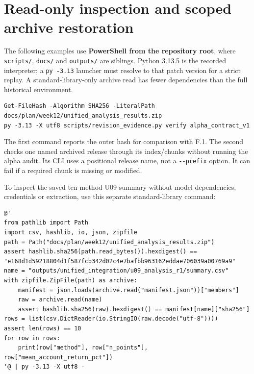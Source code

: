 \section{Read-only inspection and scoped archive restoration}\label{s:5f1ea8a5eac1b7a0}

The following examples use \textbf{PowerShell from the repository root}, where
\texttt{scripts/\allowbreak{}}, \texttt{docs/\allowbreak{}} and \texttt{outputs/\allowbreak{}} are siblings. Python 3.13.5 is the
recorded interpreter; a \texttt{py -\allowbreak{}3.\allowbreak{}13} launcher must resolve to that patch
version for a strict replay. A standard-library-only archive read has
fewer dependencies than the full historical environment.

\begin{Verbatim}[fontsize=\small,breaklines=true,breakanywhere=true]
Get-FileHash -Algorithm SHA256 -LiteralPath docs/plan/week12/unified_analysis_results.zip
py -3.13 -X utf8 scripts/revision_evidence.py verify alpha_contract_v1
\end{Verbatim}

The first command reports the outer hash for comparison with F.1. The
second checks one named archived release through its index/chunks without
running the alpha audit. Its CLI uses a positional release name, not a
\texttt{-\allowbreak{}-\allowbreak{}prefix} option. It can fail if a required chunk is missing or modified.

To inspect the saved ten-method U09 summary without model dependencies,
credentials or extraction, use this separate standard-library command:

\begin{Verbatim}[fontsize=\small,breaklines=true,breakanywhere=true]
@'
from pathlib import Path
import csv, hashlib, io, json, zipfile
path = Path("docs/plan/week12/unified_analysis_results.zip")
assert hashlib.sha256(path.read_bytes()).hexdigest() == "e168d1d59218804d1f587fcb342d02c4e7bafbb963162eddae706039a00769a9"
name = "outputs/unified_integration/u09_analysis_r1/summary.csv"
with zipfile.ZipFile(path) as archive:
    manifest = json.loads(archive.read("manifest.json"))["members"]
    raw = archive.read(name)
    assert hashlib.sha256(raw).hexdigest() == manifest[name]["sha256"]
rows = list(csv.DictReader(io.StringIO(raw.decode("utf-8"))))
assert len(rows) == 10
for row in rows:
    print(row["method"], row["n_points"], row["mean_account_return_pct"])
'@ | py -3.13 -X utf8 -
\end{Verbatim}

